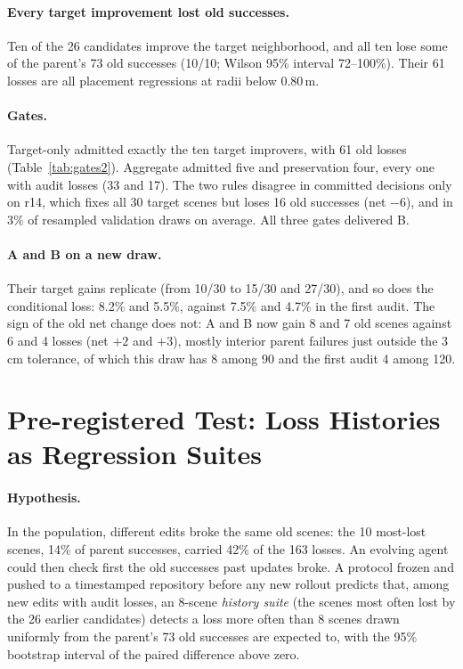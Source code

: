 \documentclass[letterpaper]{article} %
\begin{document}


\paragraph{Every target improvement lost old successes.} Ten of the 26 candidates improve the target neighborhood, and all ten lose some of the parent's 73 old successes (10/10; Wilson 95\% interval 72--100\%). Their 61 losses are all placement regressions at radii below 0.80\,m.

\paragraph{Gates.} Target-only admitted exactly the ten target improvers, with 61 old losses (Table~\ref{tab:gates2}). Aggregate admitted five and preservation four, every one with audit losses (33 and 17). The two rules disagree in committed decisions only on r14, which fixes all 30 target scenes but loses 16 old successes (net $-6$), and in 3\% of resampled validation draws on average. All three gates delivered B.

\paragraph{A and B on a new draw.} Their target gains replicate (from 10/30 to 15/30 and 27/30), and so does the conditional loss: 8.2\% and 5.5\%, against 7.5\% and 4.7\% in the first audit. The sign of the old net change does not: A and B now gain 8 and 7 old scenes against 6 and 4 losses (net $+2$ and $+3$), mostly interior parent failures just outside the 3\,cm tolerance, of which this draw has 8 among 90 and the first audit 4 among 120.

\section{Pre-registered Test: Loss Histories as Regression Suites}
\paragraph{Hypothesis.} In the population, different edits broke the same old scenes: the 10 most-lost scenes, 14\% of parent successes, carried 42\% of the 163 losses. An evolving agent could then check first the old successes past updates broke. A protocol frozen and pushed to a timestamped repository before any new rollout predicts that, among new edits with audit losses, an 8-scene \emph{history suite} (the scenes most often lost by the 26 earlier candidates) detects a loss more often than 8 scenes drawn uniformly from the parent's 73 old successes are expected to, with the 95\% bootstrap interval of the paired difference above zero.
\end{document}
